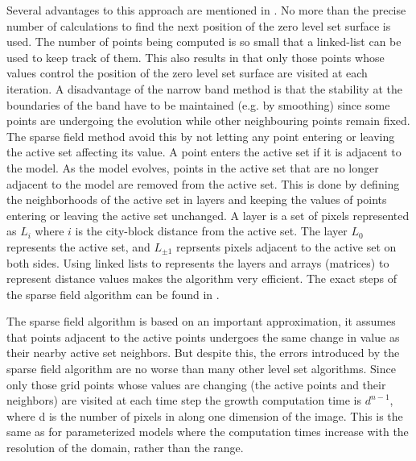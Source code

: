 Several advantages to this approach are mentioned in \cite{whitaker89}. No more than the precise number of calculations to find the next position of the zero level set surface is used. The number of points being computed is so small that a linked-list can be used to keep track of them. This also results in that only those points whose values control the position of the zero level set surface are visited at each iteration. A disadvantage of the narrow band method is that the stability at the boundaries of the band have to be maintained (e.g. by smoothing) since some points are undergoing the evolution while other neighbouring points remain fixed. The sparse field method avoid this by not letting any point entering or leaving the active set affecting its value. A point enters the active set if it is adjacent to the model. As the model evolves, points in the active set that are no longer adjacent to the model are removed from the active set. This is done by defining the neighborhoods of the active set in layers and keeping the values of points entering or leaving the active set unchanged. A layer is a set of pixels represented as \(L_{i}\) where \(i\) is the city-block distance from the active set. The layer \(L_{0}\) represents the active set, and \(L_{\pm 1}\) reprsents pixels adjacent to the active set on both sides. Using linked lists to represents the layers and arrays (matrices) to represent distance values makes the algorithm very efficient. The exact steps of the sparse field algorithm can be found in \cite{whitaker89}.

The sparse field algorithm is based on an important approximation, it assumes that points adjacent to the active points undergoes the same change in value as their nearby active set neighbors. But despite this, the errors introduced by the sparse field algorithm are no worse than many other level set algorithms. Since only those grid points whose values are changing (the active points and their neighbors) are visited at each time step the growth computation time is \(d^{n-1}\), where d is the number of pixels in along one dimension of the image. This is the same as for parameterized models where the computation times increase with the resolution of the domain, rather than the range.

